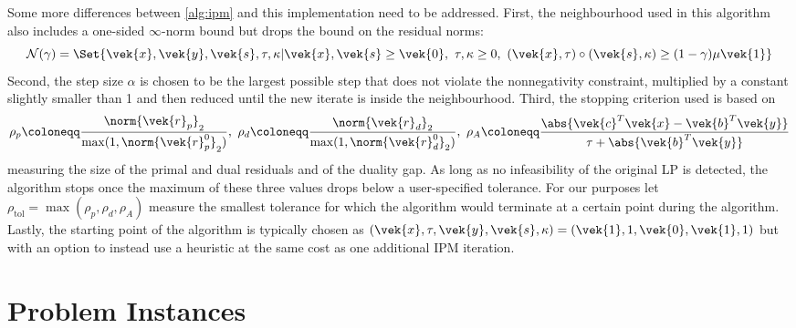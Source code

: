 Some more differences between \cref{alg:ipm} and this implementation need to be addressed.
First, the neighbourhood used in this algorithm also includes a one-sided \(\infty\)-norm bound but drops the bound on the residual norms:
\begin{equation}
  \mathcal{N}(\gamma) = \Set{ \vek{x}, \vek{y}, \vek{s}, \tau, \kappa | \vek{x}, \vek{s} \geq \vek{0}, \ \tau, \kappa \geq 0, \ (\vek{x}, \tau) \circ (\vek{s}, \kappa) \geq (1-\gamma) \mu \vek{1} }
\end{equation}
Second, the step size \(\alpha\) is chosen to be the largest possible step that does not violate the nonnegativity constraint, multiplied by a constant slightly smaller than 1 and then reduced until the new iterate is inside the neighbourhood.
Third, the stopping criterion used is based on 
\begin{equation}
  \rho_p \coloneqq \frac{\norm{\vek{r}_p}_2}{\max(1, \norm{\vek{r}^0_p}_2)}, \ 
  \rho_d \coloneqq \frac{\norm{\vek{r}_d}_2}{\max(1, \norm{\vek{r}^0_d}_2)}, \ 
  \rho_A \coloneqq \frac{\abs{\vek{c}^T\vek{x} - \vek{b}^T \vek{y}}}{\tau + \abs{\vek{b}^T\vek{y}}}
\end{equation}
measuring the size of the primal and dual residuals and of the duality gap.
As long as no infeasibility of the original LP is detected, the algorithm stops once the maximum of these three values drops below a user-specified tolerance.
For our purposes let \(\rho_{\mathrm{tol}} = \max(\rho_p, \rho_d, \rho_A)\) measure the smallest tolerance for which the algorithm would terminate at a certain point during the algorithm.
Lastly, the starting point of the algorithm is typically chosen as \((\vek{x}, \tau, \vek{y}, \vek{s}, \kappa) = (\vek{1}, 1, \vek{0}, \vek{1}, 1)\) but with an option to instead use a heuristic at the same cost as one additional IPM iteration.

\section{Problem Instances}

